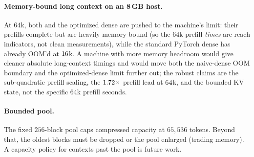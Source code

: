 \paragraph{Memory-bound long context on an 8\,GB host.} At $64$k, both \dkv{} and the optimized
dense are pushed to the machine's limit: their prefills complete but are heavily memory-bound (so the
$64$k prefill \emph{times} are reach indicators, not clean measurements), while the standard PyTorch
dense has already OOM'd at $16$k. A machine with more memory headroom would give cleaner
absolute long-context timings and would move both the naive-dense OOM boundary and the
optimized-dense limit further out; the robust claims are the sub-quadratic prefill scaling, the
$1.72\times$ prefill lead at $64$k, and the bounded KV state, not the specific
$64$k prefill seconds.

\paragraph{Bounded pool.} The fixed $256$-block pool caps compressed capacity at $65{,}536$ tokens.
Beyond that, the oldest blocks must be dropped or the pool enlarged (trading memory). A capacity
policy for contexts past the pool is future work.
